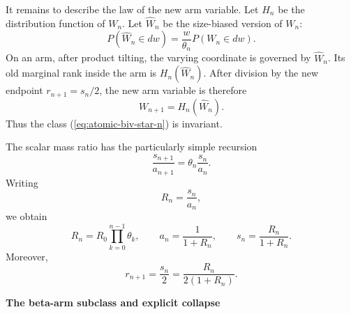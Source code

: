 \documentclass[onecolumn]{article}
\begin{document}
It remains to describe the law of the new arm variable. Let $H_{n}$ be the
distribution function of $W_{n}$. Let $\widehat{W}_{n}$ be the size-biased
version of $W_{n}$: 
\begin{equation}
P(\widehat{W}_{n}\in dw)=\frac{w}{\theta _{n}}P(W_{n}\in dw).
\label{eq:atomic-size-biased}
\end{equation}%
On an arm, after product tilting, the varying coordinate is governed by $%
\widehat{W}_{n}$. Its old marginal rank inside the arm is $H_{n}(\widehat{W}%
_{n})$. After division by the new endpoint $r_{n+1}=s_{n}/2$, the new arm
variable is therefore 
\begin{equation}
W_{n+1}=H_{n}(\widehat{W}_{n}).  \label{eq:atomic-biv-W-recursion}
\end{equation}%
Thus the class (\ref{eq:atomic-biv-star-n}) is invariant.

The scalar mass ratio has the particularly simple recursion 
\begin{equation}
\frac{s_{n+1}}{a_{n+1}}=\theta _{n}\frac{s_{n}}{a_{n}}.
\label{eq:atomic-biv-ratio}
\end{equation}%
Writing 
\begin{equation*}
R_{n}=\frac{s_{n}}{a_{n}},
\end{equation*}%
we obtain 
\begin{equation}
R_{n}=R_{0}\prod_{k=0}^{n-1}\theta _{k},\qquad a_{n}=\frac{1}{1+R_{n}}%
,\qquad s_{n}=\frac{R_{n}}{1+R_{n}}.  \label{eq:atomic-biv-closed-masses}
\end{equation}%
Moreover, 
\begin{equation}
r_{n+1}=\frac{s_{n}}{2}=\frac{R_{n}}{2(1+R_{n})}.
\label{eq:atomic-biv-closed-r}
\end{equation}

\begin{flushleft}
\textbf{The beta-arm subclass and explicit collapse}
\end{flushleft}
\end{document}
